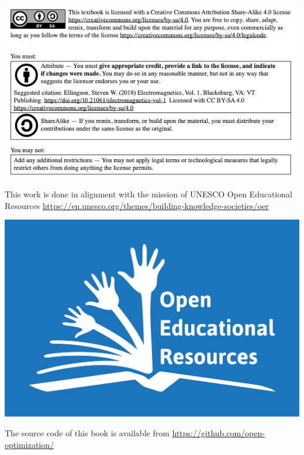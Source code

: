 \includegraphics[scale = 0.65]{front-matter/creative-commons-statement}


This work is done in alignment with the mission of UNESCO Open Educational Resources \url{https://en.unesco.org/themes/building-knowledge-societies/oer}
\begin{center}
\includegraphics[scale = 0.1]{front-matter/Global_Open_Educational_Resources_Logo.png}\footnotemark
\end{center}

The source code of this book is available from
\url{https://github.com/open-optimization/}
